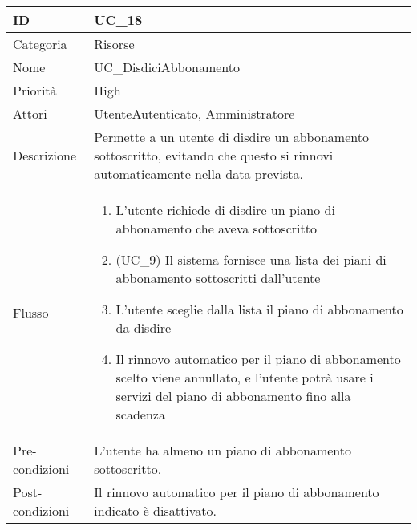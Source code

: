 \begin{center}
\begin{tabular}{ |p{2cm}|p{13cm}|  }
\hline
ID & UC\_18 \\\hline
Categoria & Risorse\\\hline
Nome & UC\_DisdiciAbbonamento\\\hline
Priorità & High \\\hline
Attori &  UtenteAutenticato, Amministratore \\\hline
Descrizione & Permette a un utente di disdire un abbonamento sottoscritto, evitando che questo si rinnovi automaticamente nella data prevista.\\\hline
Flusso &  	\begin{enumerate}
			\item L'utente richiede di disdire un piano di abbonamento che aveva sottoscritto
			\item (UC\_9) Il sistema fornisce una lista dei piani di abbonamento sottoscritti dall'utente
			\item L'utente sceglie dalla lista il piano di abbonamento da disdire
			\item Il rinnovo automatico per il piano di abbonamento scelto viene annullato, e l'utente potrà usare i servizi del piano di abbonamento fino alla scadenza
		\end{enumerate}\\\hline
Pre-condizioni & L'utente ha almeno un piano di abbonamento sottoscritto.\\\hline
Post-condizioni &  Il rinnovo automatico per il piano di abbonamento indicato è disattivato.\\\hline
\end{tabular}
\label{table_use_case:18}\newline



\end{center}
